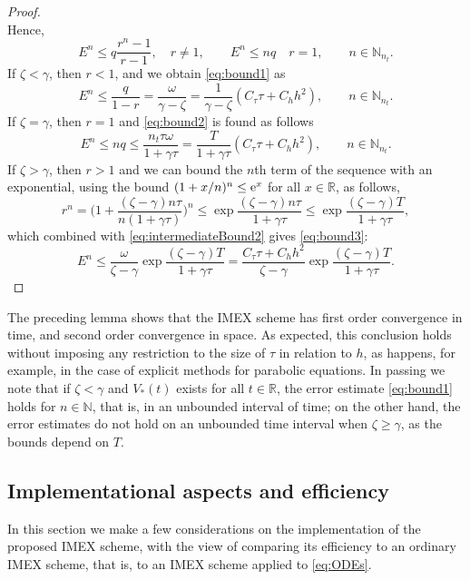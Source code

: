 \documentclass[a4paper,final]{siamart190516}
\newcommand{\Rb}{\mathbb{R}}
\newcommand{\Nb}{\mathbb{N}}
\begin{document}
\begin{proof}
\[  \]
  Hence,
  \begin{equation}\label{eq:intermediateBound2}
    E^n \leq q \frac{r^n - 1}{r-1}, \quad r \neq 1,
    \qquad E^n \leq n q \quad r = 1,
    \qquad
    n \in \Nb_{n_t}.
  \end{equation}
  If $ \zeta < \gamma$, then $r < 1$, and we obtain \eqref{eq:bound1} as
  \[
    E^n \leq 
   \frac{q}{1-r} = \frac{\omega}{\gamma - \zeta} = \frac{1}{\gamma -\zeta}(C_\tau
    \tau + C_h h^2),
    \qquad n \in \Nb_{n_t}.
  \]
%
  If $\zeta = \gamma$, then $r = 1$ and \eqref{eq:bound2} is found as follows
  \[
    E^n \leq n q 
    \leq \frac{n_t\tau \omega}{1 + \gamma\tau}%
    = \frac{T}{1 + \gamma\tau}(C_\tau \tau + C_h h^2),
    \qquad n \in \Nb_{n_t}.
  \]
%
  If $\zeta > \gamma$, then $r > 1$ and we can bound the $n$th term of the sequence
  with an exponential, using the bound $(1+x/n)^n \leq \operatorname{e}^x$ for all $x \in \Rb$, as
  follows,
  \[
    r^n = 
    \bigg(
      1 + \frac{(\zeta - \gamma) n \tau}{n(1+\gamma \tau)}
    \bigg)^n
    \leq
    \exp \frac{(\zeta - \gamma) n \tau}{1+\gamma \tau}
    \leq
    \exp \frac{(\zeta - \gamma) T}{1+\gamma \tau},
  \]
  which combined with \eqref{eq:intermediateBound2} gives \eqref{eq:bound3}:
  \[
    E^n \leq \frac{\omega}{\zeta - \gamma} \exp \frac{(\zeta - \gamma) T}{1+\gamma \tau}
     = \frac{C_\tau \tau + C_h h^2}{\zeta - \gamma} \exp \frac{(\zeta - \gamma)
     T}{1+\gamma \tau}.
  \]
\end{proof}

The preceding lemma shows that the IMEX scheme has first order convergence in time,
and second order convergence in space. As expected, this conclusion holds without
imposing any restriction to the size of $\tau$ in relation to $h$, as happens, for
example, in the case of explicit methods for parabolic equations. In passing we note
that if $\zeta < \gamma$ and $V_*(t)$ exists for all $t \in \Rb$, the error estimate
\eqref{eq:bound1} holds for $n \in \Nb$, that is, in an unbounded interval of time;
on the other hand, the error estimates do not hold on an unbounded time interval when
$\zeta \geq \gamma$, as the bounds depend on $T$.

\subsection{Implementational aspects and efficiency}


In this section we make a few considerations on the implementation of the proposed
IMEX scheme, with the view of comparing its efficiency to an ordinary IMEX scheme,
that is, to an IMEX scheme applied to \eqref{eq:ODEs}.
\end{document}

